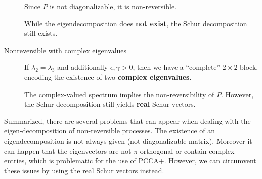 \begin{description}
	Since $P$ is not diagonalizable, it is non-reversible.
	
	While the eigendecomposition does \textbf{not exist}, the Schur decomposition still exists.
	
	
	\item[Nonreversible with complex eigenvalues] If $\lambda_2 = \lambda_3$ and additionally $\epsilon, \gamma > 0$, then we have a ``complete'' $2 \times 2$-block, encoding the existence of two \textbf{complex eigenvalues}.
	
	The complex-valued spectrum implies the non-reversibility of $P$.
	However, the Schur decomposition still yields \textbf{real} Schur vectors.
	
	
	
\end{description}

Summarized, there are several problems that can appear when dealing with the {eigen-decomposition} of non-reversible processes.
The existence of an eigendecomposition is not always given (not diagonalizable matrix).
Moreover it can happen that the eigenvectors are not $\pi$-orthogonal or contain complex entries, which is problematic for the use of PCCA+.
However, we can circumvent these issues by using the real Schur vectors instead.


